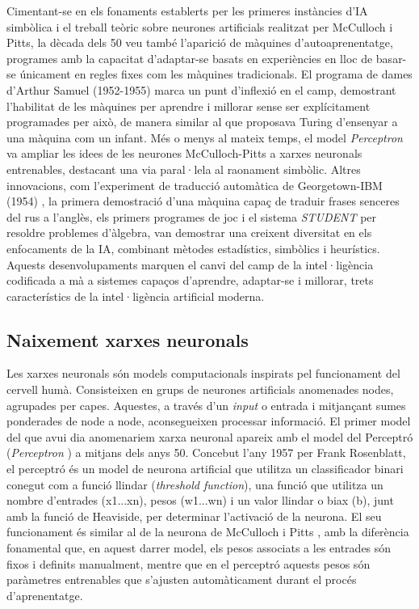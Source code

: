 \documentclass[a4paper,11pt, titlepage, twoside]{article}
\begin{document}
Cimentant-se en els fonaments establerts per les primeres instàncies d'IA simbòlica i el treball teòric sobre neurones artificials realitzat per McCulloch i Pitts, la dècada dels 50 veu també l'aparició de màquines d'autoaprenentatge, programes amb la capacitat d'adaptar-se basats en experiències en lloc de basar-se únicament en regles fixes com les màquines tradicionals. El programa de dames d'Arthur Samuel (1952-1955) \cite{samuelcheckers} marca un punt d'inflexió en el camp, demostrant l'habilitat de les màquines per aprendre i millorar sense ser explícitament programades per això, de manera similar al que proposava Turing d'ensenyar a una màquina com un infant. Més o menys al mateix temps, el model \textit{Perceptron} \cite{rosenblatt1958perceptron} va ampliar les idees de les neurones McCulloch-Pitts a xarxes neuronals entrenables, destacant una via paral·lela al raonament simbòlic. Altres innovacions, com l'experiment de traducció automàtica de Georgetown-IBM (1954) \cite{georgetown1954translation}, la primera demostració d'una màquina capaç de traduir frases senceres del rus a l'anglès, els primers programes de joc i el sistema \textit{STUDENT} \cite{bobrow1964student} per resoldre problemes d'àlgebra, van demostrar una creixent diversitat en els enfocaments de la IA, combinant mètodes estadístics, simbòlics i heurístics. Aquests desenvolupaments marquen el canvi del camp de la intel·ligència codificada a mà a sistemes capaços d'aprendre, adaptar-se i millorar, trets característics de la intel·ligència artificial moderna.

\subsection{Naixement xarxes neuronals}
Les xarxes neuronals són models computacionals inspirats pel funcionament del cervell humà. Consisteixen en grups de neurones artificials anomenades nodes, agrupades per capes. Aquestes, a través d'un \textit{input} o entrada i mitjançant sumes ponderades de node a node, aconsegueixen processar informació. El primer model del que avui dia anomenariem xarxa neuronal apareix amb el model del Perceptró (\textit{Perceptron} \cite{rosenblatt1958perceptron}) a mitjans dels anys 50. Concebut l'any 1957 per Frank Rosenblatt, el perceptró és un model de neurona artificial que utilitza un classificador binari conegut com a funció llindar (\textit{threshold function}), una funció que utilitza un nombre d'entrades (x1...xn), pesos (w1...wn) i un valor llindar o biax (b), junt amb la funció de Heaviside, per determinar l'activació de la neurona. El seu funcionament és similar al de la neurona de McCulloch i Pitts \cite{mcculloch1943}, amb la diferència fonamental que, en aquest darrer model, els pesos associats a les entrades són fixos i definits manualment, mentre que en el perceptró aquests pesos són paràmetres entrenables que s'ajusten automàticament durant el procés d'aprenentatge. \newline
\end{document}
